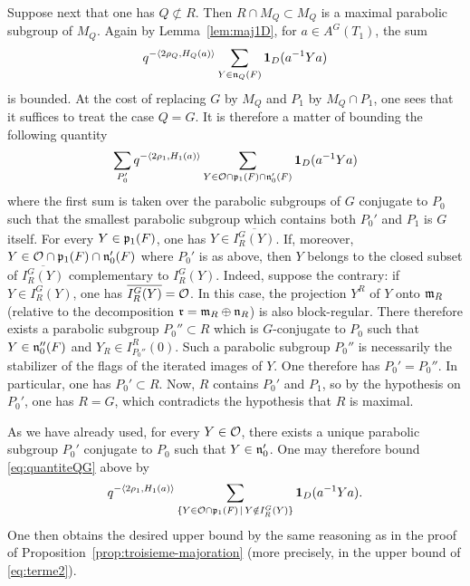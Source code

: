 \begin{paragr}
\begin{preuve}
Suppose next that one has $Q\not\subset R$. Then $R\cap M_Q\subset M_Q$ is a maximal parabolic subgroup of $M_Q$. Again by Lemma~\ref{lem:maj1D}, for $a\in A^G(T_1)$, the sum
$$q^{-\langle 2\rho_Q,H_Q(a)\rangle}\sum_{Y\in \mathfrak{n}_Q(F)} \mathbf{1}_D(a^{-1}Ya)$$
is bounded. At the cost of replacing $G$ by $M_Q$ and $P_1$ by $M_Q\cap P_1$, one sees that it suffices to treat the case $Q=G$. It is therefore a matter of bounding the following quantity
\begin{equation}
  \label{eq:quantiteQG}
  \sum_{P_0'} q^{-\langle 2\rho_1,H_1(a)\rangle}\sum_{Y\in \mathcal{O}\cap \mathfrak{p}_1(F)\cap \mathfrak{n}_0'(F)} \mathbf{1}_D(a^{-1}Ya)
\end{equation}
where the first sum is taken over the parabolic subgroups of $G$ conjugate to $P_0$ such that the smallest parabolic subgroup which contains both $P_0'$ and $P_1$ is $G$ itself. For every $Y\in \mathfrak{p}_1(F)$, one has $Y\in \overline{I^G_R(Y)}$. If, moreover, $Y\in \mathcal{O}\cap \mathfrak{p}_1(F)\cap \mathfrak{n}_0'(F)$ where $P_0'$ is as above, then $Y$ belongs to the closed subset of $\overline{I^G_R(Y)}$ complementary to $I^G_R(Y)$. Indeed, suppose the contrary: if $Y\in I^G_R(Y)$, one has $\overline{I^G_R(Y)}=\mathcal{O}$. In this case, the projection $Y^R$ of $Y$ onto $\mathfrak{m}_R$ (relative to the decomposition $\mathfrak{r}=\mathfrak{m}_R\oplus \mathfrak{n}_R$) is also \og block-regular\fg{}. There therefore exists a parabolic subgroup $P_0''\subset R$ which is $G$-conjugate to $P_0$ such that $Y\in \mathfrak{n}_0''(F)$ and $Y_R\in I^R_{P_0''}(0)$. Such a parabolic subgroup $P_0''$ is necessarily the stabilizer of the flags of the iterated images of $Y$. One therefore has $P_0'=P_0''$. In particular, one has $P_0'\subset R$. Now, $R$ contains $P_0'$ and $P_1$, so by the hypothesis on $P_0'$, one has $R=G$, which contradicts the hypothesis that $R$ is maximal.

As we have already used, for every $Y\in \mathcal{O}$, there exists a unique parabolic subgroup $P_0'$ conjugate to $P_0$ such that $Y\in \mathfrak{n}_0'$. One may therefore bound \eqref{eq:quantiteQG} above by
\begin{equation}
  \label{eq:majfinale}
  q^{-\langle 2\rho_1,H_1(a)\rangle}\sum_{\{Y\in \mathcal{O}\cap \mathfrak{p}_1(F)\,|\,Y\notin I^G_R(Y)\}} \mathbf{1}_D(a^{-1}Ya).
\end{equation}
One then obtains the desired upper bound by the same reasoning as in the proof of Proposition~\ref{prop:troisieme-majoration} (more precisely, in the upper bound of \eqref{eq:terme2}).
\end{preuve}
\end{paragr}

